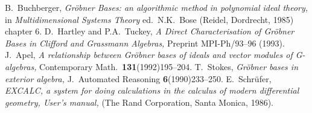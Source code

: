 \begin{thebibliography}{M}

	B.~Buchberger, {\em
	Gr{\"o}bner Bases: an algorithmic method in polynomial ideal theory,}
	in {\em Multidimensional Systems Theory\/} ed.~N.K.~Bose
	(Reidel, Dordrecht, 1985) chapter 6.
	D.~Hartley and P.A.~Tuckey, {\em
	A Direct Characterisation of Gr{\"o}bner Bases in Clifford and
	Grassmann Algebras,}
	Preprint MPI-Ph/93--96 (1993).
	J.~Apel, {\em A relationship between Gr{\"o}bner bases of ideals and
	vector modules of G-algebras,}
	Contemporary Math.~{\bf 131}(1992)195--204.
	T.~Stokes, {\em
	Gr{\"o}bner bases in exterior algebra,}
	J.~Automated Reasoning {\bf 6}(1990)233--250.
	E.~Schr{\"u}fer, {\em
	EXCALC, a system for doing calculations in the calculus of modern
	differential geometry, User's manual,}
	(The Rand Corporation, Santa Monica, 1986).

\end{thebibliography}






